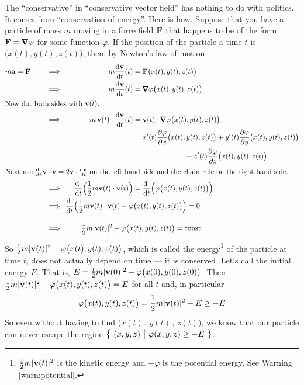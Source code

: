 \begin{eg}\label{eg:potentialEnergy}
The ``conservative'' in ``conservative vector field'' has nothing
to do with politics. It comes from ``conservation of energy''.
Here is how. Suppose that you have a particle of mass $m$ moving in
a force field $\mathbf{F}$ that happens to be of the form $\vF=\vnabla\varphi$
for some function $\varphi$. 
If the position of the particle a time $t$ is $\big(x(t),y(t),z(t)\big)$,
then, by Newton's law of motion,
\begin{alignat*}{3}
 m\va = \vF \qquad
&\implies & m\diff{\vv}{t}(t) &= \vF\big(x(t),y(t),z(t)\big) \\
&\implies & m\diff{\vv}{t}(t) &= \vnabla\varphi\big(x(t),y(t),z(t)\big)\\
\intertext{Now dot both sides with $\vv(t)$.} 
&\implies & m\,\vv(t)\cdot\diff{\vv}{t}(t) &= \vv(t)\cdot\vnabla\varphi\big(x(t),y(t),z(t)\big)  \\
& & &=x'(t)\frac{\partial\varphi}{\partial x}\big(x(t),y(t),z(t)\big)
+y'(t)\frac{\partial\varphi}{\partial y}\big(x(t),y(t),z(t)\big) \\
& & & \hskip1in
+z'(t)\frac{\partial\varphi}{\partial z}\big(x(t),y(t),z(t)\big)\\
\intertext{Next use $\diff{\ }{t}\vv\cdot\vv=2\vv\cdot\diff{\vv}{t}$
on the left hand side and the chain rule on the right hand side.}
&\implies &\ \ \diff{\ }{t}\Big(\frac{1}{2} m \vv(t)\cdot\vv(t)\Big) 
    &= \diff{\ }{t}\Big(\varphi\big(x(t),y(t),z(t)\big)\Big) \\
&\implies &  &\hskip-1.3in\diff{\ }{t}\Big(\frac{1}{2} m \vv(t)\cdot\vv(t) 
    -\varphi\big(x(t),y(t),z(t)\big)\Big) =0 \\[0.1in]
&\implies &  &\hskip-1.0in\frac{1}{2} m |\vv(t)|^2
    -\varphi\big(x(t),y(t),z(t)\big) = \text{const}
\end{alignat*}
So $\frac{1}{2} m |\mathbf{v}(t)|^2
    -\varphi\big(x(t),y(t),z(t)\big)$, which is called the 
energy\footnote{$\frac{1}{2} m |\mathbf{v}(t)|^2$ is the kinetic energy and
$-\varphi$ is the potential energy. See Warning \ref{warn:potential}.}  of the 
particle at time $t$, does not actually depend on time --- it is conserved.
Let's call the initial energy $E$. That is,
$E=\frac{1}{2} m |\mathbf{v}(0)|^2 -\varphi\big(x(0),y(0),z(0)\big)$.
Then $\frac{1}{2} m |\mathbf{v}(t)|^2 -\varphi\big(x(t),y(t),z(t)\big)=E$
for all $t$ and, in particular
\begin{equation*}
\varphi\big(x(t),y(t),z(t)\big) = \frac{1}{2} m |\mathbf{v}(t)|^2 -E
             \ge -E
\end{equation*}
So even without having to find $\big(x(t)\,,\,y(t)\,,\,z(t)\big)$,
we know that our particle can never escape the region 
$\big\{ \ (x,y,z)\ \big|\ \varphi(x,y,z)\ge -E\ \big\}$.
\end{eg}



